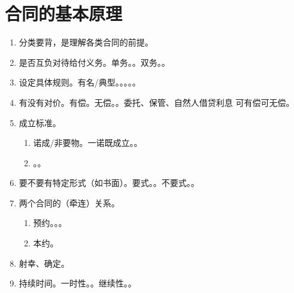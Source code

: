 \section{合同的基本原理}
\begin{enumerate}
  \item 分类要背，是理解各类合同的前提。
  \item 是否互负对待给付义务。单务。。双务。。
  \item {} \hz 设定具体规则。有名/典型。。。。。
  \item 有没有对价。有偿。无偿。。委托、保管、自然人借贷利息 \yjt 可有偿可无偿。
  \item 成立标准。
        \begin{enumerate}
          \item 诺成/非要物。一诺既成立。。
          \item {}。。
        \end{enumerate}
  \item 要不要有特定形式（如书面）。要式。。不要式。。
  \item 两个合同的（牵连）关系。
        \begin{enumerate}
          \item 预约。。。
          \item 本约。
        \end{enumerate}
  \item 射幸、确定。
  \item 持续时间。一时性。。继续性。。
\end{enumerate}
